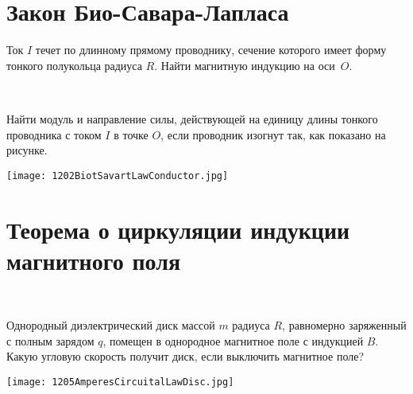 \section{Закон Био-Савара-Лапласа}

\begin{ex}
Ток $I$ течет по длинному прямому проводнику, сечение которого имеет форму тонкого полукольца радиуса $R$. Найти магнитную индукцию на оси~$O$.
\begin{ans}
\end{ans}
\end{ex}

\begin{ex}
\hspace{0pt} \\
\begin{minipage}{.65\textwidth}
Найти модуль и направление силы, действующей на единицу длины тонкого проводника с током $I$ в точке $O$, если проводник изогнут так, как показано на рисунке.
\end{minipage}
\begin{minipage}{.35\textwidth}
\centering
\texttt{[image: 1202BiotSavartLawConductor.jpg]}
\end{minipage}
\begin{ans}
\end{ans}
\end{ex}

\section{Теорема о циркуляции индукции магнитного поля}

\begin{ex}
\hspace{0pt} \\
\begin{minipage}{.65\textwidth}
Однородный диэлектрический диск массой $m$ радиуса $R$, равномерно заряженный с полным зарядом $q$, помещен в однородное магнитное поле с индукцией $B$. Какую угловую скорость получит диск, если выключить магнитное поле?
\end{minipage}
\begin{minipage}{.35\textwidth}
\centering
\texttt{[image: 1205AmperesCircuitalLawDisc.jpg]}
\end{minipage}
\begin{ans}
\end{ans}
\end{ex}

